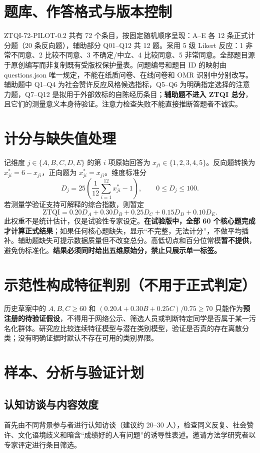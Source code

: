 \documentclass[11pt,a4paper,UTF8,fontset=none]{ctexart}
\begin{document}
\section{题库、作答格式与版本控制}
ZTQI-72-PILOT-0.2 共有 72 个条目，按固定随机顺序呈现：A--E 各 12 条正式计分题（20 条反向题），辅助部分 Q01--Q12 共 12 题。采用 5 级 Likert 反应：1 非常不同意、2 比较不同意、3 不确定/中立、4 比较同意、5 非常同意。全部题目源于原创编写而非复制既有受版权保护量表。问题编号和题目 ID 的映射由 questions.json 唯一规定，不能在纸质问卷、在线问卷和 OMR 识别中分别改写。
辅助题中 Q1--Q4 为社会赞许反应风格候选指标，Q5--Q6 为明确指定选择的注意力题，Q7--Q12 是拟用于外部效标的自陈经历条目；\textbf{辅助题不进入 ZTQI 总分}，且它们的测量意义本身待验证。注意力检查失败不能直接推断答题者不诚实。
\section{计分与缺失值处理}
记维度 $j\in\{A,B,C,D,E\}$ 的第 $i$ 项原始回答为 $x_{ji}\in\{1,2,3,4,5\}$。反向题转换为 $x^*_{ji}=6-x_{ji}$，正向题为 $x^*_{ji}=x_{ji}$。维度标准分
\begin{equation}
 D_j=25\left(\frac{1}{12}\sum_{i=1}^{12}x^*_{ji}-1\right),\qquad 0\le D_j\le100.
\end{equation}
若测量学验证支持可解释的综合指数，则暂定
\begin{equation}
 \mathrm{ZTQI}=0.20D_A+0.30D_B+0.25D_C+0.15D_D+0.10D_E.
\end{equation}
此权重不是统计估计，仅是试验性专家设定。\textbf{在试验版中，全部 60 个核心题完成才计算正式结果}；如果任何核心题缺失，显示“不完整，无法计分”，不做平均插补。辅助题缺失可提示数据质量但不改变总分。高低切点和百分位常模\textbf{暂不提供}，避免伪标准化。\textbf{结果必须同时给出五维原始分，禁止只展示单一标签。}
\section{示范性构成特征判别（不用于正式判定）}
历史草案中的 $A,B,C\ge60$ 和 $(0.20A+0.30B+0.25C)/0.75\ge70$ 只能作为\textbf{预注册的待验证假设}，不得用于网络公示、筛选人员或判断特定同学是否属于某一污名化群体。研究应比较连续特征模型与潜在类别模型，验证是否真的存在离散分类；没有明确证据时默认不存在可用的类别界限。
\section{样本、分析与验证计划}
\subsection{认知访谈与内容效度}
首先由不同背景参与者进行认知访谈（建议约 20--30 人），检查同义反复、社会赞许、文化语境歧义和暗含“成绩好的人有问题”的诱导性表述。邀请方法学研究者以专家评定进行条目筛选。
\end{document}
